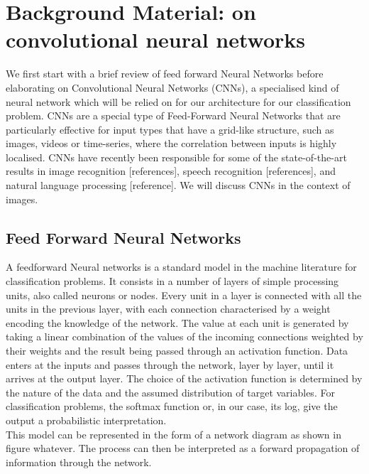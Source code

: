 \chapter{Background Material: on convolutional neural networks}

\noindent We first start with a brief review of feed forward Neural Networks before elaborating on Convolutional Neural Networks (CNNs), a specialised kind of neural network which will be relied on for our architecture for our classification problem. CNNs are a special type of Feed-Forward Neural Networks that are particularly effective for input types that have a grid-like structure, such as images, videos or time-series, where the correlation between inputs is highly localised. CNNs have recently been responsible for some of the state-of-the-art results in image recognition [references], speech recognition [references], and natural language processing [reference]. We will discuss CNNs in the context of images.

\section{Feed Forward Neural Networks}

A feedforward Neural networks is a standard model in the machine literature for classification problems. It consists in a number of layers of simple processing units, also called neurons or nodes. Every unit in a layer is connected with all the units in the previous layer, with each connection characterised by a weight encoding the knowledge of the network. The value at each unit is generated by taking a linear combination of the values of the incoming connections weighted by their weights and the result being passed through an activation function. Data enters at the inputs and passes through the network, layer by layer, until it arrives at the output layer. The choice of the activation function is determined by the nature of the data and the assumed distribution of target variables. For classification problems, the softmax function or, in our case, its log, give the output a probabilistic interpretation.\\

\noindent This model can be represented in the form of a network diagram as shown in figure whatever. The process can then be interpreted as a forward propagation of information through the network.\\

